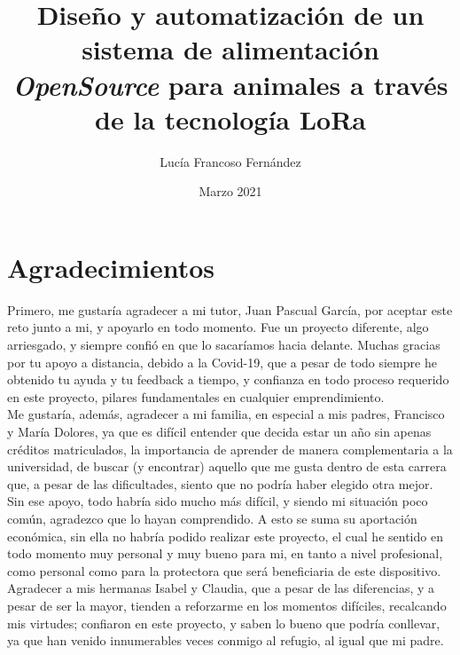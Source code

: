 \documentclass[12pt]{article}
\begin{document}

	\title{Diseño y automatización de un sistema de alimentación \textit{OpenSource} para animales a través de la tecnología LoRa}
	\author{Lucía Francoso Fernández}
	\date{Marzo 2021}
	
	\maketitle
	\pagebreak
	
	\tableofcontents
	
	\pagebreak

	\listoffigures
	
	\pagebreak
	
	\listoftables
	
	\pagebreak
	
	\section*{Agradecimientos}
	
	\noindent Primero, me gustaría agradecer a mi tutor, Juan Pascual García, por aceptar este reto junto a mi, y apoyarlo en todo momento. Fue un proyecto diferente, algo arriesgado, y siempre confió en que lo sacaríamos hacia delante. Muchas gracias por tu apoyo a distancia, debido a la Covid-19, que a pesar de todo siempre he obtenido tu ayuda y tu feedback a tiempo, y confianza en todo proceso requerido en este proyecto, pilares fundamentales en cualquier emprendimiento.\\
	
	\noindent Me gustaría, además, agradecer a mi familia, en especial a mis padres, Francisco y María Dolores, ya que es difícil entender que decida estar un año sin apenas créditos matriculados, la importancia de aprender de manera complementaria a la universidad, de buscar (y encontrar) aquello que me gusta dentro de esta carrera que, a pesar de las dificultades, siento que no podría haber elegido otra mejor. Sin ese apoyo, todo habría sido mucho más difícil, y siendo mi situación poco común, agradezco que lo hayan comprendido. A esto se suma su aportación económica, sin ella no habría podido realizar este proyecto, el cual he sentido en todo momento muy personal y muy bueno para mi, en tanto a nivel profesional, como personal como para la protectora que será beneficiaria de este dispositivo. Agradecer a mis hermanas Isabel y Claudia, que a pesar de las diferencias, y a pesar de ser la mayor, tienden a reforzarme en los momentos difíciles, recalcando mis virtudes; confiaron en este proyecto, y saben lo bueno que podría conllevar, ya que han venido innumerables veces conmigo al refugio, al igual que mi padre.\\
	
\end{document}
